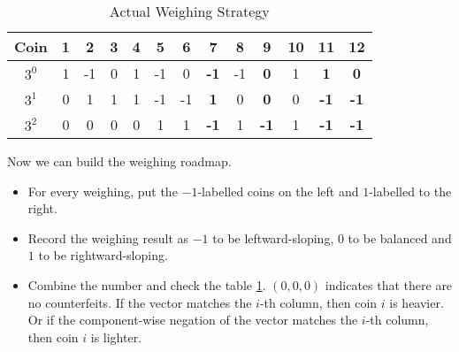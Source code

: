 \begin{exercise}
\begin{solution}
\begin{enumerate}
    \begin{table}[H]
        \begin{center}
        \begin{tabular}{ccccccccccccc}
        \hline
        Coin  & 1 & 2  & 3 & 4 & 5  & 6  & \textbf{7}  & 8  & \textbf{9}  & 10 & \textbf{11} & \textbf{12} \\ \hline
        $3^0$ & 1 & -1 & 0 & 1 & -1 & 0  & \textbf{-1} & -1 & \textbf{0}  & 1  & \textbf{1}  & \textbf{0}  \\
        $3^1$ & 0 & 1  & 1 & 1 & -1 & -1 & \textbf{1}  & 0  & \textbf{0}  & 0  & \textbf{-1} & \textbf{-1} \\
        $3^2$ & 0 & 0  & 0 & 0 & 1  & 1  & \textbf{-1} & 1  & \textbf{-1} & 1  & \textbf{-1} & \textbf{-1} \\ \hline
        \end{tabular}
        \end{center}
        \caption{Actual Weighing Strategy}
        \label{tab:1}
    \end{table}
    
    Now we can build the weighing roadmap.
    \begin{itemize}
        \item For every weighing, put the $-1$-labelled coins on the left and $1$-labelled to the right.
        \item Record the weighing result as $-1$ to be leftward-sloping, $0$ to be balanced and $1$ to be rightward-sloping.
        \item Combine the number and check the table \ref{tab:1}. $(0,0,0)$ indicates that there are no counterfeits. If the vector matches the $i$-th column, then coin $i$ is heavier. Or if the component-wise negation of the vector matches the $i$-th column, then coin $i$ is lighter.
    \end{itemize}

\end{enumerate}
\end{solution}
\end{exercise}
